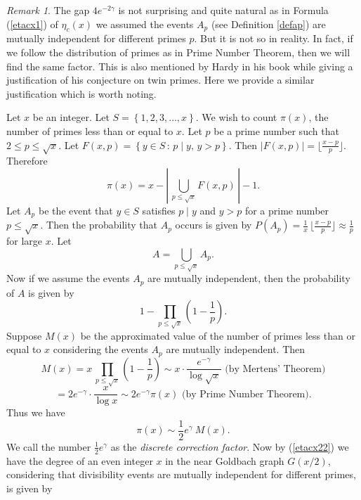 \documentclass[11pt]{article}
\theoremstyle{definition}
\theoremstyle{remark}
\newtheorem{remark}[theorem]{Remark}
\numberwithin{equation}{section}
\newcommand{\set}[1]{\left\{#1\right\}}
\newcommand{\Set}[2]{\set{#1\, :\, #2}}
\begin{document}
\begin{remark}\label{rem:HL}
The gap $4e^{-2\gamma}$ is not surprising and quite natural as in Formula (\ref{etacx1}) of $\eta_c(x)$ we assumed the events $A_p$ (see Definition \ref{defap}) are mutually independent for different primes $p$. But it is not so in reality. In fact, if we follow the distribution of primes as in Prime Number Theorem, then we will find the same factor. This is also mentioned by Hardy in his book \cite{HWR} while giving a justification of his conjecture on twin primes. Here we provide a similar justification which is worth noting. 

\vspace{1em}
\noindent
Let $x$ be an integer. Let $S=\set{1,2,3,\ldots,x}$. We wish to count $\pi(x)$, the number of primes less than or equal to $x$. Let $p$ be a prime number such that $2\leq p\leq\sqrt{x}$. Let $F(x,p)=\Set{y\in S}{p\mid y,\, y>p}$. Then $|F(x,p)|=\lfloor\frac{x-p}{p}\rfloor$. Therefore 
\begin{equation}\label{eqnpix}
\pi(x)=x-\left|\,\bigcup\limits_{p\leq \sqrt{x}} F(x,p)\,\right|-1.
\end{equation}
Let $A_p$ be the event that $y\in S$ satisfies $p\mid y$ and $y>p$ for a prime number $p\leq\sqrt{x}$. Then the probability that $A_p$ occurs is given by $P(A_p)=\frac{1}{x}\,\lfloor\frac{x-p}{p}\rfloor\approx\frac{1}{p}$ for large $x$. Let $$A=\bigcup\limits_{p\leq\sqrt{x}} A_p.$$
Now if we assume the events $A_p$ are mutually independent, then the probability of $A$ is given by
$$1-\prod\limits_{p\leq\sqrt{x}} \left( 1-\frac{1}{p}\right).$$
Suppose $M(x)$ be the approximated value of the number of primes less than or equal to $x$ considering the events $A_p$ are mutually independent. Then 
$$M(x) = x\,\prod\limits_{p\leq\sqrt{x}} \left( 1-\frac{1}{p}\right) \sim x\cdot\frac{e^{-\gamma}}{\log \sqrt{x}} \text{ (by Mertens' Theorem)}$$ 
$$= 2 e^{-\gamma}\cdot\frac{x}{\log x} \sim 2 e^{-\gamma}\pi(x) \text{ (by Prime Number Theorem)}.$$
Thus we have 
\begin{equation}\label{dcf}
\pi(x)\sim \frac{1}{2} e^\gamma\ M(x).
\end{equation}
We call the number $\frac{1}{2} e^\gamma$ as the {\em discrete correction factor}. Now by (\ref{etacx22}) we have the degree of an even integer $x$ in the near Goldbach graph $G(x/2)$, considering that divisibility events are mutually independent for different primes, is given by


\end{remark}
\end{document}
